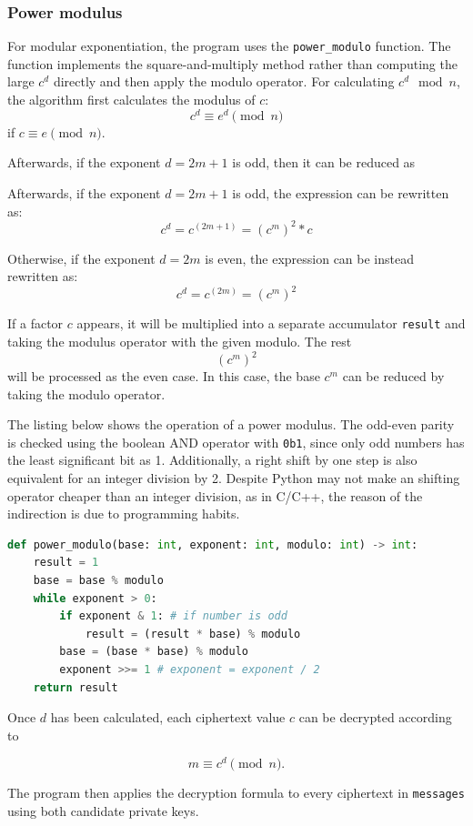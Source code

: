 \documentclass[11pt,a4paper]{article}
\begin{document}
\subsubsection*{Power modulus}

For modular exponentiation, the program uses the \texttt{power\_modulo} function. The function implements the square-and-multiply method rather than computing the large $c^d$ directly and then apply the modulo operator. For calculating $c^d \mod n$, the algorithm first calculates the modulus of $c$:
$$c^d \equiv e^d \pmod{n} $$
if $c \equiv e \pmod{n}$.

Afterwards, if the exponent $d=2m+1$ is odd, then it can be reduced as

Afterwards, if the exponent $d=2m+1$ is odd, the expression can be rewritten as:
$$c^d = c^(2m+1) = (c^m)^2*c$$

Otherwise, if the exponent $d=2m$ is even, the expression can be instead rewritten as:
$$c^d = c^(2m) = (c^m)^2$$

If a factor $c$ appears, it will be multiplied into a separate accumulator \texttt{result} and taking the modulus operator with the given modulo. The rest $$(c^m)^2$$ will be processed as the even case. In this case, the base $c^m$ can be reduced by taking the modulo operator.

The listing below shows the operation of a power modulus. The odd-even parity is checked using the boolean AND operator with \texttt{0b1}, since only odd numbers has the least significant bit as 1. Additionally, a right shift by one step is also equivalent for an integer division by 2. Despite Python may not make an shifting operator cheaper than an integer division, as in C/C++, the reason of the indirection is due to programming habits.

\begin{lstlisting}[language=python]
def power_modulo(base: int, exponent: int, modulo: int) -> int:
    result = 1
    base = base % modulo
    while exponent > 0:
        if exponent & 1: # if number is odd
            result = (result * base) % modulo
        base = (base * base) % modulo
        exponent >>= 1 # exponent = exponent / 2
    return result
\end{lstlisting}

Once $d$ has been calculated, each ciphertext value $c$ can be decrypted according to

\[
m \equiv c^d \pmod n.
\]

The program then applies the decryption formula to every ciphertext in \texttt{messages} using both candidate private keys.
\end{document}
